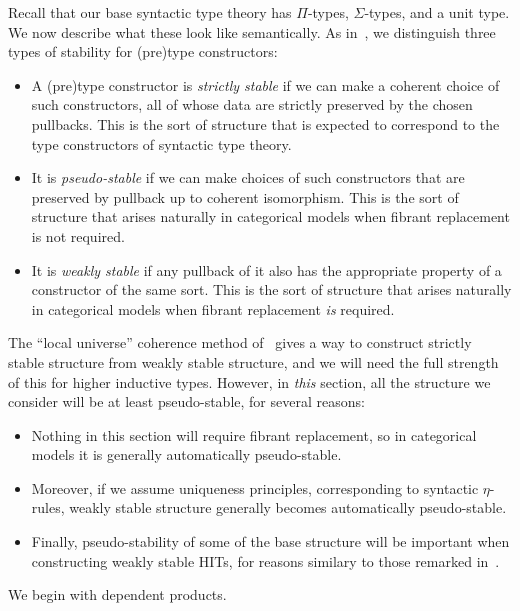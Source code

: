 \documentclass{amsart}
\begin{document}
Recall that our base syntactic type theory has $\Pi$-types, $\Sigma$-types, and a unit type.
We now describe what these look like semantically.
As in~\cite{lw:localuniv}, we distinguish three types of stability for (pre)type constructors:
\begin{itemize}
\item A (pre)type constructor is \emph{strictly stable} if we can make a coherent choice of such constructors, all of whose data are strictly preserved by the chosen pullbacks.
  This is the sort of structure that is expected to correspond to the type constructors of syntactic type theory.
\item It is \emph{pseudo-stable} if we can make choices of such constructors that are preserved by pullback up to coherent isomorphism.
  This is the sort of structure that arises naturally in categorical models when fibrant replacement is not required.
\item It is \emph{weakly stable} if any pullback of it also has the appropriate property of a constructor of the same sort.
  This is the sort of structure that arises naturally in categorical models when fibrant replacement \emph{is} required.
\end{itemize}
The ``local universe'' coherence method of~\cite{lw:localuniv} gives a way to construct strictly stable structure from weakly stable structure, and we will need the full strength of this for higher inductive types.
However, in \emph{this} section, all the structure we consider will be at least pseudo-stable, for several reasons:
\begin{itemize}
\item Nothing in this section will require fibrant replacement, so in categorical models it is generally automatically pseudo-stable.
\item Moreover, if we assume uniqueness principles, corresponding to syntactic $\eta$-rules, weakly stable structure generally becomes automatically pseudo-stable.
\item Finally, pseudo-stability of some of the base structure will be important when constructing weakly stable HITs, for reasons similary to those remarked in~\cite[3.4.4.9--10]{lw:localuniv}.
\end{itemize}
We begin with dependent products.
\end{document}
